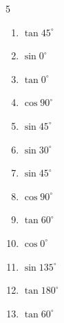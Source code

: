 \begin{multicols}{5}
\begin{enumerate}
  \item $\displaystyle \tan{45^\circ}$

        \phantom{$\displaystyle =1$}

  \item $\displaystyle \sin{0^\circ}$

        \phantom{$\displaystyle =0$}

  \item $\displaystyle \tan{0^\circ}$

        \phantom{$\displaystyle =0$}

  \item $\displaystyle \cos{90^\circ}$

        \phantom{$\displaystyle =0$}

  \item $\displaystyle \sin{45^\circ}$


  \item $\displaystyle \sin{30^\circ}$


  \item $\displaystyle \sin{45^\circ}$


  \item $\displaystyle \cos{90^\circ}$

        \phantom{$\displaystyle =0$}

  \item $\displaystyle \tan{60^\circ}$


  \item $\displaystyle \cos{0^\circ}$

        \phantom{$\displaystyle =1$}

  \item $\displaystyle \sin{135^\circ}$


  \item $\displaystyle \tan{180^\circ}$

        \phantom{$\displaystyle =0$}

\columnbreak %

\resetques

  \item $\displaystyle \tan{60^\circ}$


\end{enumerate}
\end{multicols}
